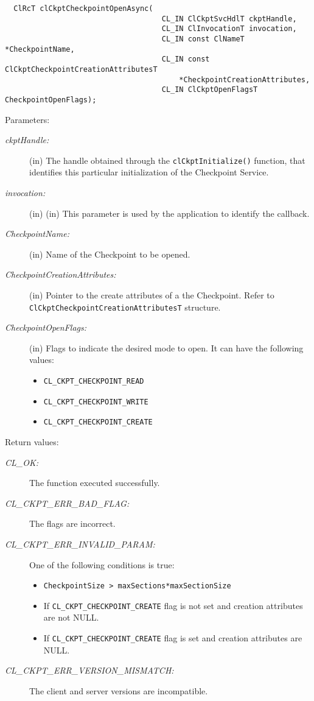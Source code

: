 \begin{flushleft}
\begin{Desc}
\footnotesize\begin{verbatim}  ClRcT clCkptCheckpointOpenAsync(
                              		CL_IN ClCkptSvcHdlT ckptHandle,
                              		CL_IN ClInvocationT invocation,
                              		CL_IN const ClNameT  *CheckpointName,
                              		CL_IN const ClCkptCheckpointCreationAttributesT 
                              			*CheckpointCreationAttributes,
                              		CL_IN ClCkptOpenFlagsT CheckpointOpenFlags);
\end{verbatim}
\normalsize
\end{Desc}
\begin{Desc}
\item[Parameters:]
\begin{description}
\item[{\em ckpt\-Handle:}](in) The handle obtained through the {\tt{clCkptInitialize()}} function, that identifies this particular 
initialization of the Checkpoint Service.
\item[{\em invocation:}](in) (in) This parameter is used by the application to identify the callback.
\item[{\em Checkpoint\-Name:}](in) Name of the Checkpoint to be opened.\item[{\em Checkpoint\-Creation\-Attributes:}](in) Pointer to the create 
attributes of a the
Checkpoint. Refer to {\tt{ClCkptCheckpointCreationAttributesT}} structure.
\item[{\em Checkpoint\-Open\-Flags:}] (in) Flags to indicate the desired mode to open. It can have the following values: \begin{itemize}
\item {\tt CL\_\-CKPT\_\-CHECKPOINT\_\-READ} \item {\tt CL\_\-CKPT\_\-CHECKPOINT\_\-WRITE} \item {\tt CL\_\-CKPT\_\-CHECKPOINT\_\-CREATE} \end{itemize}
\end{description}
\end{Desc}
\begin{Desc}
\item[Return values:]
\begin{description}
\item[{\em CL\_\-OK:}]The function executed successfully.
\item[{\em CL\_\-CKPT\_\-ERR\_\-BAD\_\-FLAG:}]The flags are incorrect.
\item[{\em CL\_\-CKPT\_\-ERR\_\-INVALID\_\-PARAM:}]One of the following conditions is true:
\begin{itemize}
\item
{\tt{CheckpointSize > maxSections*maxSectionSize}}
\item
If {\tt{CL\_\-CKPT\_\-CHECKPOINT\_\-CREATE}} flag is not set and creation attributes are not NULL.
\item
If {\tt{CL\_\-CKPT\_\-CHECKPOINT\_\-CREATE}} flag is set and creation attributes are NULL.
\end{itemize}
\item[{\em CL\_\-CKPT\_\-ERR\_\-VERSION\_\-MISMATCH:}]The client and server versions are incompatible.


\end{description}
\end{Desc}
\end{flushleft}
